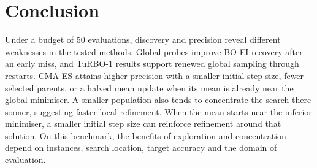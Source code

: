\section{Conclusion}\label{sec:conclusion}
Under a budget of 50 evaluations, discovery and precision reveal different weaknesses in the tested methods. Global probes improve BO-EI recovery after an early miss, and TuRBO-1 results support renewed global sampling through restarts. CMA-ES attains higher precision with a smaller initial step size,
fewer selected parents, or a halved mean update when its mean is
already near the global minimiser. A smaller population also tends
to concentrate the search there sooner, suggesting faster local
refinement. When the mean starts near the inferior minimiser,
a smaller initial step size can reinforce refinement around that
solution. On this benchmark, the benefits of exploration and concentration depend on instances, search location, target accuracy and the domain of evaluation.
